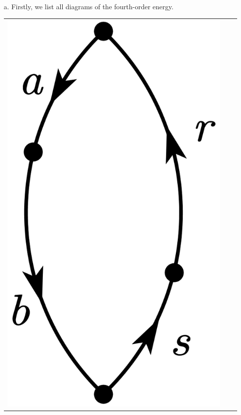 \documentclass[a4paper]{book}
\newcounter{solution}[chapter]
\begin{document}
	\begin{solution}
	
	\begin{itemize}	
	
	\item[a.] Firstly, we list all diagrams of the fourth-order energy. 	
	\begin{center}
	\begin{tabular}{ccc}
	
		\begin{minipage}{0.22\linewidth}
		\centering
		\includegraphics[scale=1.0,trim=0 -4 0 -4]{./pictures/6.07/diagram_1.png}
		\end{minipage} &
		

\end{tabular}
\end{center}
\end{itemize}
\end{solution}
\end{document}
